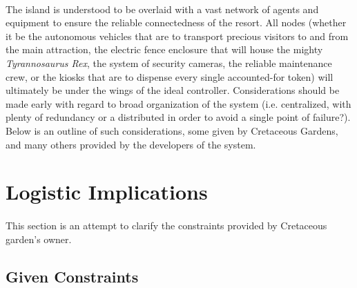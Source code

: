 \documentclass[12pt]{article}
\begin{document}
\paragraph{} The island is understood to be overlaid with a vast network of agents and equipment to
ensure the reliable connectedness of the resort. All nodes (whether it be the autonomous vehicles that are
to transport precious visitors to and from the main attraction, the electric fence enclosure that will 
house the mighty \textit{Tyrannosaurus Rex}, the system of security cameras, the reliable maintenance crew, 
or the kiosks that are to dispense every single accounted-for token) will ultimately be under the wings
of the ideal controller. Considerations should be made early with regard to broad organization of the system
(i.e. centralized, with plenty of redundancy or a distributed in order to avoid a single point of failure?).
Below is an outline of such considerations, some given by Cretaceous Gardens, and many others provided by
the developers of the system.


\section{Logistic Implications}
\paragraph{} This section is an attempt to clarify the constraints provided by Cretaceous garden's owner.

    \subsection{Given Constraints}
\end{document}

